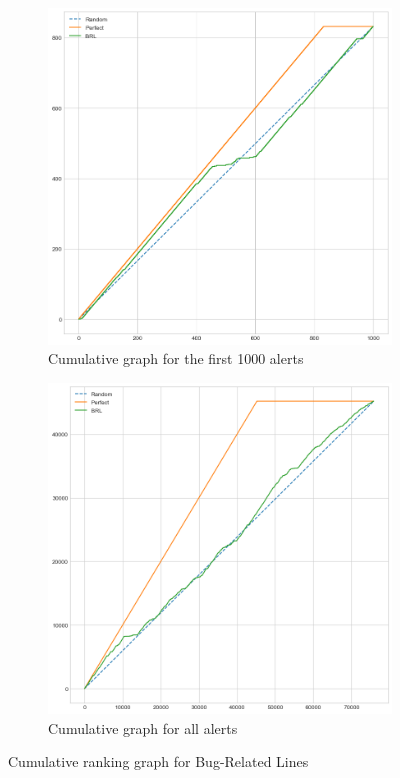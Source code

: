 \begin{figure}[H]
	\begin{subfigure}{.5\textwidth}
		\centering
		\includegraphics[scale=0.3]{./src/brls/brls_cumulative_graph_top1000.png}
		\caption{Cumulative graph for the first 1000 alerts}\label{}
	\end{subfigure}%
	\begin{subfigure}{.5\textwidth}
		\centering
		\includegraphics[scale=0.3]{./src/brls/brls_cumulative_graph_all.png}
		\caption{Cumulative graph for all alerts}\label{}
	\end{subfigure}
	\caption{Cumulative ranking graph for Bug-Related Lines}
	\label{results:cumulative_brls}
\end{figure}


